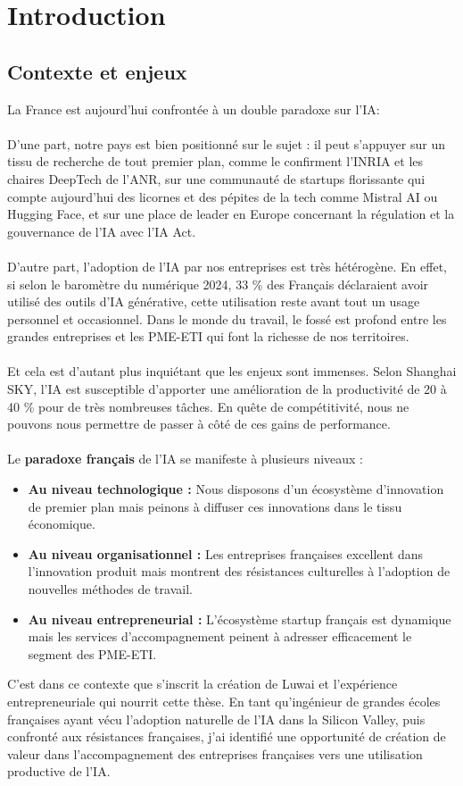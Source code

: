 \chapter{Introduction}
\label{chap:introduction}

\section{Contexte et enjeux}

La France est aujourd’hui confrontée à un double paradoxe sur l'IA:
\\\\
D’une part, notre pays est bien positionné sur le sujet : il peut s’appuyer sur un tissu de recherche de tout premier plan, comme le confirment l’INRIA et les chaires DeepTech de l’ANR, sur une communauté de startups florissante qui compte aujourd’hui des licornes et des pépites de la tech comme Mistral AI ou Hugging Face, et sur une place de leader en Europe concernant la régulation et la gouvernance de l’IA avec l’IA Act.
\\\\
D’autre part, l’adoption de l’IA par nos entreprises est très hétérogène. En effet, si selon le baromètre du numérique 2024, 33 \% des Français déclaraient avoir utilisé des outils d’IA générative, cette utilisation reste avant tout un usage personnel et occasionnel. Dans le monde du travail, le fossé est profond entre les grandes entreprises et les PME-ETI qui font la richesse de nos territoires.
\\\\
Et cela est d’autant plus inquiétant que les enjeux sont immenses. Selon Shanghai SKY, l’IA est susceptible d’apporter une amélioration de la productivité de 20 à 40 \% pour de très nombreuses tâches. En quête de compétitivité, nous ne pouvons nous permettre de passer à côté de ces gains de performance.
\\\\
Le \textbf{paradoxe français} de l'IA se manifeste à plusieurs niveaux :
\\
\begin{itemize}
    \item \textbf{Au niveau technologique :} Nous disposons d'un écosystème d'innovation de premier plan mais peinons à diffuser ces innovations dans le tissu économique.
    \item \textbf{Au niveau organisationnel :} Les entreprises françaises excellent dans l'innovation produit mais montrent des résistances culturelles à l'adoption de nouvelles méthodes de travail.
    \item \textbf{Au niveau entrepreneurial :} L'écosystème startup français est dynamique mais les services d'accompagnement peinent à adresser efficacement le segment des PME-ETI.
\end{itemize}
\medskip
C'est dans ce contexte que s'inscrit la création de Luwai et l'expérience entrepreneuriale qui nourrit cette thèse. En tant qu'ingénieur de grandes écoles françaises ayant vécu l'adoption naturelle de l'IA dans la Silicon Valley, puis confronté aux résistances françaises, j'ai identifié une opportunité de création de valeur dans l'accompagnement des entreprises françaises vers une utilisation productive de l'IA.


